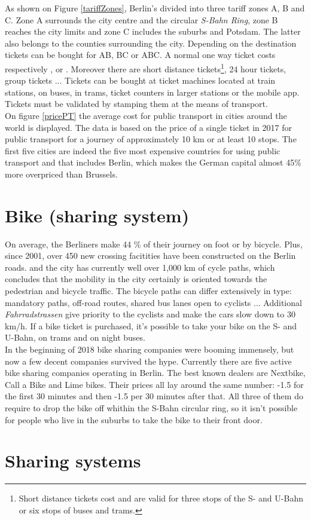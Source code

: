 As shown on Figure \ref{tariffZones}, Berlin's divided into three tariff zones A, B and C. Zone A surrounds the city centre and the circular \textit{S-Bahn Ring}, zone B reaches the city limits and zone C includes the suburbs and Potsdam. The latter also belongs to the counties surrounding the city. Depending on the destination tickets can be bought for AB, BC or ABC\cite{tarif}. A normal one way ticket costs respectively ,  or . Moreover there are short distance tickets\footnote{Short distance tickets cost  and are valid for three stops of the S- and U-Bahn or six stops of buses and trams.}, 24 hour tickets, group tickets ...  Tickets can be bought at ticket machines located at train stations, on buses, in trams, ticket counters in larger stations or the mobile app. Tickets must be validated by stamping them at the means of transport\cite{ticketing1}. \\ \newline
On figure \ref{pricePT} the average cost for public transport in cities around the world is displayed. The data is based on the price of a single ticket in 2017 for public transport for a journey of approximately 10 km or at least 10 stops. The first five cities are indeed the five most expensive countries for using public transport and that includes Berlin, which makes the German capital almost 45\% more overpriced than Brussels.


\section{Bike (sharing system)}

On average, the Berliners make 44 \% of their journey on foot or by bicycle. Plus, since 2001, over 450 new crossing facitities have been constructed on the Berlin roads. and the city has currently well over 1,000 km of cycle paths, which concludes that the mobility in the city certainly is oriented towards the pedestrian and bicycle traffic. The bicycle paths can differ extensively in type: mandatory paths, off-road routes, shared bus lanes open to cyclists ... Additional \textit{Fahrradstrassen} give priority to the cyclists and make the cars slow down to 30 km/h. If a bike ticket is purchased, it's possible to take your bike on the S- and U-Bahn, on trams and on night buses\cite{MobilityCity}\cite{cycling}. \\ \newline
In the beginning of 2018 bike sharing companies were booming immensely, but now a few decent companies survived the hype. Currently there are five active bike sharing companies operating in Berlin. The best known dealers are Nextbike, Call a Bike and Lime bikes. Their prices all lay around the same number: -1.5 for the first 30 minutes and then -1.5 per 30 minutes after that. All three of them do require to drop the bike off whithin the S-Bahn circular ring, so it isn't possible for people who live in the suburbs to take the bike to their front door\cite{bikeshare}.


\section{Sharing systems}

